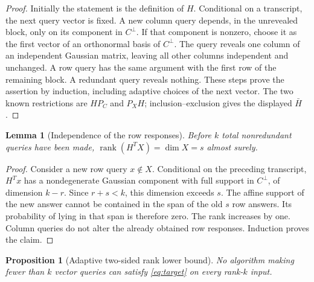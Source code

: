 \documentclass[11pt]{article}
\numberwithin{equation}{section}
\newtheorem{lemma}[theorem]{Lemma}
\newtheorem{proposition}[theorem]{Proposition}
\theoremstyle{definition}
\newcommand{\rank}{\operatorname{rank}}
\begin{document}
\begin{proof}
Initially the statement is the definition of $H$. Conditional on a transcript,
the next query vector is fixed. A new column query depends, in the unrevealed
block, only on its component in $C^\perp$. If that component is nonzero,
choose it as the first vector of an orthonormal basis of $C^\perp$.
The query reveals one column of an independent Gaussian matrix, leaving
all other columns independent and unchanged. A row query has the same
argument with the first row of the remaining block. A redundant query
reveals nothing. These steps prove the assertion by induction, including
adaptive choices of the next vector. The two known restrictions are $HP_C$
and $P_XH$; inclusion--exclusion gives the displayed $\bar H$.
\end{proof}

\begin{lemma}[Independence of the row responses]
\label{lem:rowrank}
Before $k$ total nonredundant queries have been made,
$\rank(H^TX)=\dim X=s$ almost surely.
\end{lemma}

\begin{proof}
Consider a new row query $x\notin X$. Conditional on the preceding transcript,
$H^Tx$ has a nondegenerate Gaussian component with full support in
$C^\perp$, of dimension $k-r$. Since $r+s<k$, this dimension exceeds $s$.
The affine support of the new answer cannot be contained in the span of the
old $s$ row answers. Its probability of lying in that span is therefore zero.
The rank increases by one. Column queries do not alter the already obtained
row responses. Induction proves the claim.
\end{proof}

\begin{proposition}[Adaptive two-sided rank lower bound]
\label{prop:ranklower}
No algorithm making fewer than $k$ vector queries can satisfy
\eqref{eq:target} on every rank-$k$ input.
\end{proposition}
\end{document}
